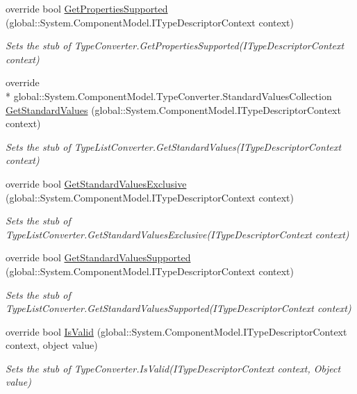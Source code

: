 \begin{DoxyCompactItemize}
override bool \hyperlink{class_system_1_1_component_model_1_1_fakes_1_1_stub_type_list_converter_af50eb6c7c2ab792bf02c4968d0306c4a}{Get\-Properties\-Supported} (global\-::\-System.\-Component\-Model.\-I\-Type\-Descriptor\-Context context)
\begin{DoxyCompactList}\small\item\em Sets the stub of Type\-Converter.\-Get\-Properties\-Supported(\-I\-Type\-Descriptor\-Context context)\end{DoxyCompactList}\item 
override \\*
global\-::\-System.\-Component\-Model.\-Type\-Converter.\-Standard\-Values\-Collection \hyperlink{class_system_1_1_component_model_1_1_fakes_1_1_stub_type_list_converter_a400778ae570fe787275fb29a1a7aeeb3}{Get\-Standard\-Values} (global\-::\-System.\-Component\-Model.\-I\-Type\-Descriptor\-Context context)
\begin{DoxyCompactList}\small\item\em Sets the stub of Type\-List\-Converter.\-Get\-Standard\-Values(\-I\-Type\-Descriptor\-Context context)\end{DoxyCompactList}\item 
override bool \hyperlink{class_system_1_1_component_model_1_1_fakes_1_1_stub_type_list_converter_a132095b0d77b69b83522cd4eebe223b9}{Get\-Standard\-Values\-Exclusive} (global\-::\-System.\-Component\-Model.\-I\-Type\-Descriptor\-Context context)
\begin{DoxyCompactList}\small\item\em Sets the stub of Type\-List\-Converter.\-Get\-Standard\-Values\-Exclusive(\-I\-Type\-Descriptor\-Context context)\end{DoxyCompactList}\item 
override bool \hyperlink{class_system_1_1_component_model_1_1_fakes_1_1_stub_type_list_converter_a524299f3859a117e81c12fe9a8346cb1}{Get\-Standard\-Values\-Supported} (global\-::\-System.\-Component\-Model.\-I\-Type\-Descriptor\-Context context)
\begin{DoxyCompactList}\small\item\em Sets the stub of Type\-List\-Converter.\-Get\-Standard\-Values\-Supported(\-I\-Type\-Descriptor\-Context context)\end{DoxyCompactList}\item 
override bool \hyperlink{class_system_1_1_component_model_1_1_fakes_1_1_stub_type_list_converter_a7f4ce1ca2afd7c81ee79836fadeb1fcc}{Is\-Valid} (global\-::\-System.\-Component\-Model.\-I\-Type\-Descriptor\-Context context, object value)
\begin{DoxyCompactList}\small\item\em Sets the stub of Type\-Converter.\-Is\-Valid(\-I\-Type\-Descriptor\-Context context, Object value)\end{DoxyCompactList}\end{DoxyCompactItemize}
